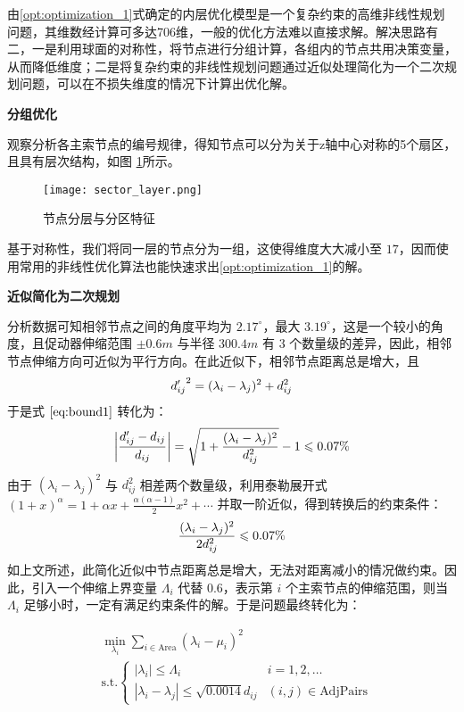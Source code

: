 \documentclass[withoutpreface,bwprint,fontset=macnew]{cumcmthesis} %
\begin{document}
		由\ref {opt:optimization_1}式确定的内层优化模型是一个复杂约束的高维非线性规划问题，其维数经计算可多达706维，一般的优化方法难以直接求解。解决思路有二，一是利用球面的对称性，将节点进行分组计算，各组内的节点共用决策变量，从而降低维度；二是将复杂约束的非线性规划问题通过近似处理简化为一个二次规划问题，可以在不损失维度的情况下计算出优化解。
		
		\textbf{分组优化}
		
		观察分析各主索节点的编号规律，得知节点可以分为关于z轴中心对称的5个扇区，且具有层次结构，如图 \ref {fig:sector_layer}所示。
		
		\begin{figure}[!h]
			\centering
			\texttt{[image: sector\_layer.png]} %
			\caption{节点分层与分区特征}
			\label{fig:sector_layer}
		\end{figure}

		基于对称性，我们将同一层的节点分为一组，这使得维度大大减小至 $17$，因而使用常用的非线性优化算法也能快速求出\ref{opt:optimization_1}的解。
		
		\textbf{近似简化为二次规划}
		
		分析数据可知相邻节点之间的角度平均为 $2.17^\circ$，最大 $3.19^\circ$，这是一个较小的角度，且促动器伸缩范围 $\pm 0.6m$ 与半径 $300.4m$ 有 $3$ 个数量级的差异，因此，相邻节点伸缩方向可近似为平行方向。在此近似下，相邻节点距离总是增大，且
		$$
		{d'_{ij}}^2=(\lambda_i-\lambda_j)^2+d_{ij}^2\notag
		$$
		于是式 $\ref{eq:bound1}$ 转化为：
		$$
		\left|\frac{d'_{ij}-d_{ij}}{d_{ij}}\right|=\sqrt{1+\frac{(\lambda_i-\lambda_j)^2}{d_{ij}^2}}-1\leqslant 0.07\%\notag
		$$
		由于 $(\lambda_i-\lambda_j)^2$ 与 $d_{ij}^2$ 相差两个数量级，利用泰勒展开式 $(1+x)^\alpha=1+\alpha x+\frac{\alpha(\alpha-1)}{2}x^2+\cdots$ 并取一阶近似，得到转换后的约束条件：
		$$
		\frac{(\lambda_i-\lambda_j)^2}{2d^2_{ij}}\leqslant 0.07\%\notag
		$$
		如上文所述，此简化近似中节点距离总是增大，无法对距离减小的情况做约束。因此，引入一个伸缩上界变量 $\Lambda_i$ 代替 $0.6$，表示第 $i$ 个主索节点的伸缩范围，则当 $\Lambda_i$ 足够小时，一定有满足约束条件的解。于是问题最终转化为：
		
		\begin{align}
			&\min_{\lambda_i} \sum_{i\in\text{Area}}(\lambda_i-\mu_i)^2\\
			&\text{s.t.}\begin{cases}
					|\lambda_i|\leqslant\Lambda_i&i=1,2,\ldots\\
					|\lambda_i-\lambda_j|\leqslant \sqrt{0.0014}d_{ij}&(i,j)\in\text{AdjPairs}
					\end{cases}
		\end{align}
		
\end{document}
